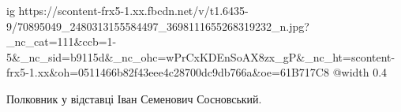  
 
 
 
 

\ifcmt
  ig https://scontent-frx5-1.xx.fbcdn.net/v/t1.6435-9/70895049_2480313155584497_3698111655268319232_n.jpg?_nc_cat=111&ccb=1-5&_nc_sid=b9115d&_nc_ohc=wPrCxKDEnSoAX8zx_gP&_nc_ht=scontent-frx5-1.xx&oh=0511466b82f43eee4c28700dc9db766a&oe=61B717C8
  @width 0.4
\fi


Полковник у відставці Іван Семенович Сосновський.
